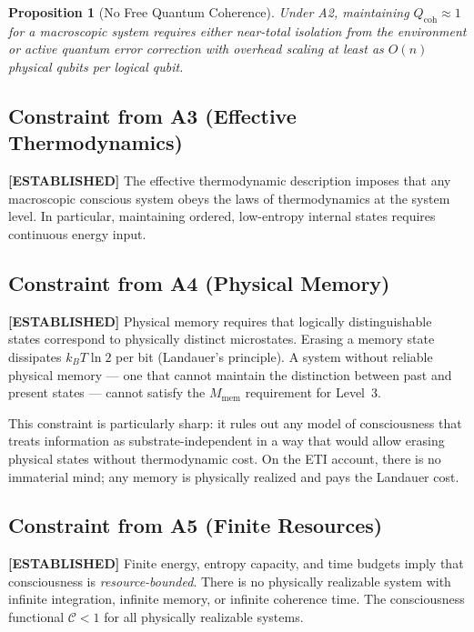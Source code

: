 \documentclass[12pt,letterpaper]{article}
\newtheorem{proposition}{Proposition}[section]
\newcommand{\ESTABLISHED}[1]{\textcolor{green!50!black}{\textbf{[ESTABLISHED]}} #1}
\newcommand{\Cfunc}{\mathcal{C}}
\newcommand{\Qcoh}{Q_{\mathrm{coh}}}
\newcommand{\Mmem}{M_{\mathrm{mem}}}
\begin{document}
\begin{proposition}[No Free Quantum Coherence]
\label{prop:no_free_coherence}
Under A2, maintaining $\Qcoh \approx 1$ for a macroscopic system requires
either near-total isolation from the environment or active quantum error
correction with overhead scaling at least as $O(n)$ physical qubits per
logical qubit.
\end{proposition}

\subsection{Constraint from A3 (Effective Thermodynamics)}

\ESTABLISHED{} The effective thermodynamic description imposes that any
macroscopic conscious system obeys the laws of thermodynamics at the system
level. In particular, maintaining ordered, low-entropy internal states
requires continuous energy input.

\subsection{Constraint from A4 (Physical Memory)}

\ESTABLISHED{} Physical memory requires that logically distinguishable states
correspond to physically distinct microstates. Erasing a memory state
dissipates $k_B T \ln 2$ per bit (Landauer's principle). A system without
reliable physical memory --- one that cannot maintain the distinction between
past and present states --- cannot satisfy the $\Mmem$ requirement for
Level~3.

This constraint is particularly sharp: it rules out any model of consciousness
that treats information as substrate-independent in a way that would allow
erasing physical states without thermodynamic cost. On the ETI account,
there is no immaterial mind; any memory is physically realized and pays the
Landauer cost.

\subsection{Constraint from A5 (Finite Resources)}

\ESTABLISHED{} Finite energy, entropy capacity, and time budgets imply that
consciousness is \emph{resource-bounded}. There is no physically realizable
system with infinite integration, infinite memory, or infinite coherence time.
The consciousness functional $\Cfunc < 1$ for all physically realizable systems.
\end{document}
